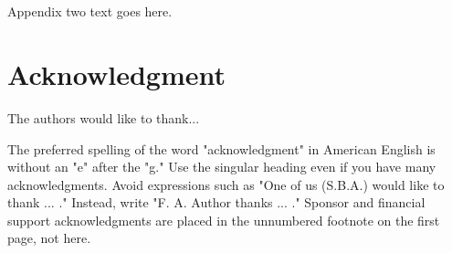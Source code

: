\documentclass[journal]{IAENGtran}
\begin{document}
\section{}
Appendix two text goes here.


\section*{Acknowledgment}


The authors would like to thank...

The preferred spelling of the word "acknowledgment" in American
English is without an "e" after the "g." Use the singular heading
even if you have many acknowledgments. Avoid expressions such as
"One of us (S.B.A.) would like to thank ... ." Instead, write "F. A.
Author thanks ... ." Sponsor and financial support acknowledgments
are placed in the unnumbered footnote on the first page, not here.


\ifCLASSOPTIONcaptionsoff
  \newpage
\fi





%
%
%





\end{document}
